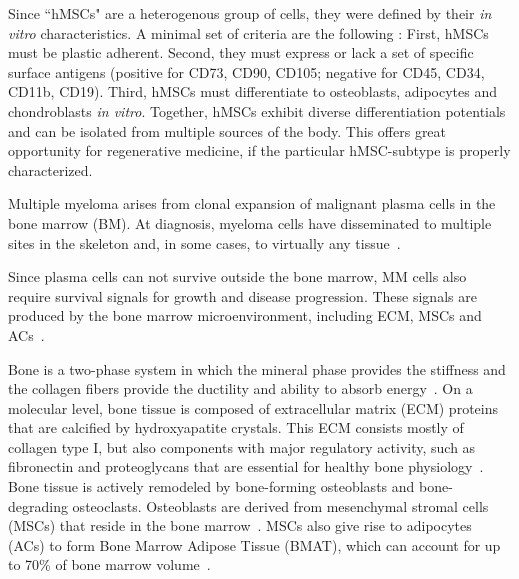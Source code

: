 Since ``hMSCs" are a heterogenous group of cells, they were defined by their
\textit{in vitro} characteristics. A minimal set of criteria are the following
\cite{dominiciMinimalCriteriaDefining2006}: First, hMSCs must be plastic
adherent. Second, they must express or lack a set of specific surface antigens
(positive for CD73, CD90, CD105; negative for CD45, CD34, CD11b, CD19). Third,
hMSCs must differentiate to osteoblasts, adipocytes and chondroblasts \textit{in
vitro}. Together, hMSCs exhibit diverse differentiation potentials and can be
isolated from multiple sources of the body. This offers great opportunity for
regenerative medicine, if the particular hMSC-subtype is properly characterized.


Multiple myeloma arises from clonal expansion of malignant plasma cells in the
bone marrow (BM). At diagnosis, myeloma cells have disseminated to multiple
sites in the skeleton and, in some cases, to virtually any
tissue~\cite{rajkumarMultipleMyelomaCurrent2020,
bladeExtramedullaryDiseaseMultiple2022}.


Since plasma cells can not survive outside the bone marrow, MM cells also
require survival signals for growth and disease progression. These signals are
produced by the bone marrow microenvironment, including ECM, MSCs and
ACs~\cite{kiblerAdhesiveInteractionsHuman1998,
garcia-ortizRoleTumorMicroenvironment2021}.


Bone is a two-phase system in which the mineral phase provides the stiffness and
the collagen fibers provide the ductility and ability to absorb
energy~\cite{viguet-carrinRoleCollagenBone2006}. On a molecular level, bone
tissue is composed of extracellular matrix (ECM) proteins that are calcified by
hydroxyapatite crystals. This ECM consists mostly of collagen type I, but also
components with major regulatory activity, such as fibronectin and proteoglycans
that are essential for healthy bone
physiology~\cite{alcorta-sevillanoDecipheringRelevanceBone2020}. Bone tissue is
actively remodeled by bone-forming osteoblasts and bone-degrading osteoclasts.
Osteoblasts are derived from mesenchymal stromal cells (MSCs) that reside in the
bone marrow~\cite{friedensteinOsteogenesisTransplantsBone1966,
pittengerMultilineagePotentialAdult1999}. MSCs also give rise to adipocytes
(ACs) to form Bone Marrow Adipose Tissue (BMAT), which can account for up to
70\% of bone marrow volume~\cite{fazeliMarrowFatBone2013}.

